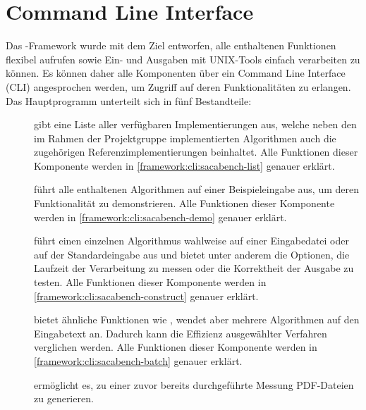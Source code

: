 \section{Command Line Interface}

Das  \sacabench-Framework wurde mit dem Ziel entworfen, alle enthaltenen Funktionen flexibel aufrufen sowie Ein- und Ausgaben mit UNIX-Tools einfach verarbeiten zu können.
Es können daher alle Komponenten über ein Command Line Interface (CLI) angesprochen werden, um Zugriff auf deren Funktionalitäten zu erlangen.
Das Hauptprogramm unterteilt sich in fünf Bestandteile:
\begin{description}
    \item[] gibt eine Liste aller verfügbaren Implementierungen aus, welche neben den im Rahmen der Projektgruppe implementierten Algorithmen auch die zugehörigen Referenzimplementierungen beinhaltet.
        Alle Funktionen dieser Komponente werden in \cref{framework:cli:sacabench-list} genauer erklärt.
    \item[] führt alle enthaltenen Algorithmen auf einer Beispieleingabe aus, um deren Funktionalität zu demonstrieren.
        Alle Funktionen dieser Komponente werden in \cref{framework:cli:sacabench-demo} genauer erklärt.
    \item[] führt einen einzelnen Algorithmus wahlweise auf einer Eingabedatei oder auf der Standardeingabe aus und bietet unter anderem die Optionen, die Laufzeit der Verarbeitung zu messen oder die Korrektheit der Ausgabe zu testen. Alle Funktionen dieser Komponente werden in \cref{framework:cli:sacabench-construct} genauer erklärt.
    \item[] bietet ähnliche Funktionen wie , wendet aber mehrere Algorithmen auf den Eingabetext an. Dadurch kann die Effizienz ausgewählter Verfahren verglichen werden. Alle Funktionen dieser Komponente werden in \cref{framework:cli:sacabench-batch} genauer erklärt.
    \item[] ermöglicht es, zu einer zuvor bereits durchgeführte Messung PDF-Dateien zu generieren.
\end{description}







